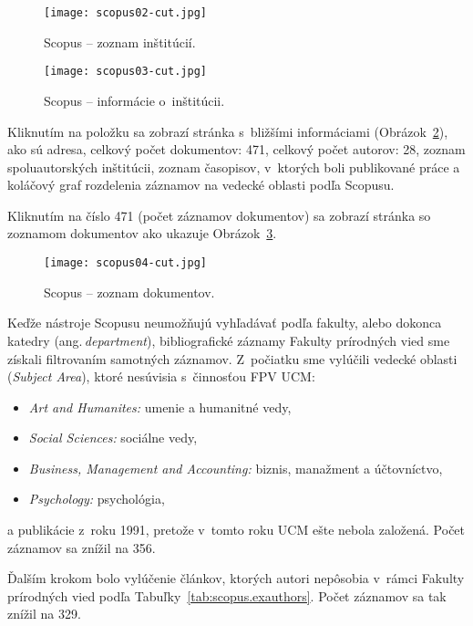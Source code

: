 \begin{figure}
  \centering
  \texttt{[image: scopus02-cut.jpg]}
  \caption{Scopus -- zoznam inštitúcií.}
  \label{fig:scopus.institutionlist}
\end{figure}

\begin{figure}
  \centering
  \texttt{[image: scopus03-cut.jpg]}
  \caption{Scopus -- informácie o~inštitúcii.}
  \label{fig:scopus.institutioninfo}
\end{figure}

Kliknutím na položku sa zobrazí stránka s~bližšími informáciami
(Obrázok~\ref{fig:scopus.institutioninfo}), ako sú adresa, celkový počet
dokumentov: 471, celkový počet autorov: 28, zoznam spoluautorských inštitúcii,
zoznam časopisov, v~ktorých boli publikované práce a koláčový graf rozdelenia
záznamov na vedecké oblasti podľa Scopusu.

Kliknutím na číslo 471 (počet záznamov dokumentov) sa zobrazí stránka so
zoznamom dokumentov ako ukazuje Obrázok~\ref{fig:scopus.documentlist}.

\begin{figure}
  \centering
  \texttt{[image: scopus04-cut.jpg]}
  \caption{Scopus -- zoznam dokumentov.}
  \label{fig:scopus.documentlist}
\end{figure}

Keďže nástroje Scopusu neumožňujú vyhľadávať podľa fakulty, alebo dokonca
katedry (ang.\,\emph{department}), bibliografické záznamy Fakulty prírodných
vied sme získali filtrovaním samotných záznamov.  Z~počiatku sme vylúčili
vedecké oblasti (\emph{Subject Area}), ktoré nesúvisia s~činnosťou FPV UCM:
\begin{itemize}
\item \emph{Art and Humanites:} umenie a humanitné vedy,
\item \emph{Social Sciences:} sociálne vedy,
\item \emph{Business, Management and Accounting:} biznis, manažment a
  účtovníctvo,
\item \emph{Psychology:} psychológia,
\end{itemize}
a publikácie z~roku 1991, pretože v~tomto roku UCM ešte nebola založená.  Počet
záznamov sa znížil na 356.

Ďalším krokom bolo vylúčenie článkov, ktorých autori nepôsobia v~rámci Fakulty
prírodných vied podľa Tabuľky~\ref{tab:scopus.exauthors}.  Počet záznamov sa tak
znížil na 329.

